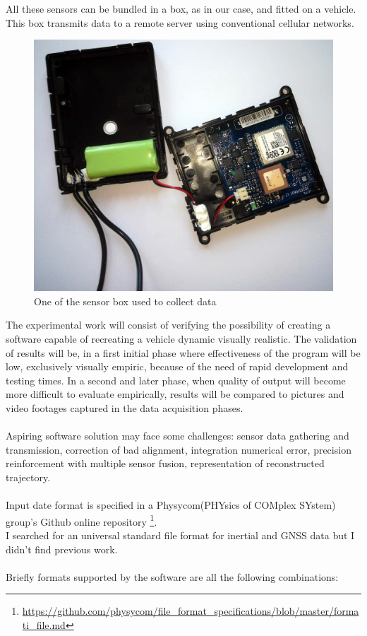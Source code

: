 All these sensors can be bundled in a box, as in our case, and fitted on a vehicle. This box transmits data to a remote server using conventional cellular networks. 

\begin{figure}[H]
\includegraphics[width=\linewidth]{box.jpg}
\caption{One of the sensor box used to collect data}
\end{figure}

\justify
The experimental work will consist of verifying the possibility of creating a software capable of recreating a vehicle dynamic visually realistic.
The validation of results will be, in a first initial phase where effectiveness of the program will be low, exclusively visually empiric, because of the need of rapid development and testing times. In a second and later phase, when quality of output will become more difficult to evaluate empirically, results will be compared to pictures and video footages captured in the data acquisition phases. \\
\\
Aspiring software solution may face some challenges: sensor data gathering and transmission, correction of bad alignment, integration numerical error, precision reinforcement with multiple sensor fusion, representation of reconstructed trajectory. \\
\\
Input date format is specified in a Physycom(PHYsics of COMplex SYstem) group's Github online repository \footnote{\url{https://github.com/physycom/file_format_specifications/blob/master/formati_file.md}}. \\
I searched for an universal standard file format for inertial and GNSS data but I didn't find previous work. \\
\\	
Briefly formats supported by the software are all the following combinations:

